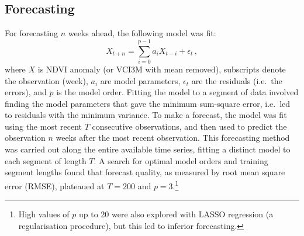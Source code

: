 \documentclass[review]{elsarticle}
\begin{document}
\subsection{Forecasting}
 For forecasting $n$ weeks ahead, the following model was fit:
\begin{equation}
X_{t+n}=\sum_{i=0}^{p-1}a_iX_{t-i}+\epsilon_t\,, \label{eq:AR1}
\end{equation}
where $X$ is NDVI anomaly (or VCI3M with mean removed), subscripts denote the observation (week), $a_i$ are model parameters, $\epsilon_t$ are the residuals (i.e.~the errors), and $p$ is the model order. Fitting the model to a segment of data involved finding the model parameters that gave the minimum sum-square error, i.e.~led to residuals with the minimum variance. To make a forecast, the model was fit using the most recent $T$ consecutive observations, and then used to predict the observation $n$ weeks after the most recent observation. This forecasting method was carried out along the entire available time series, fitting a distinct model to each segment of length $T$. A search for optimal model orders and training segment lengths found that forecast quality, as measured by root mean square error (RMSE), plateaued at $T=200$ and $p=3$.\footnote{High values of $p$ up to 20 were also explored with LASSO regression (a regularisation procedure), but this led to inferior forecasting.}




\end{document}
